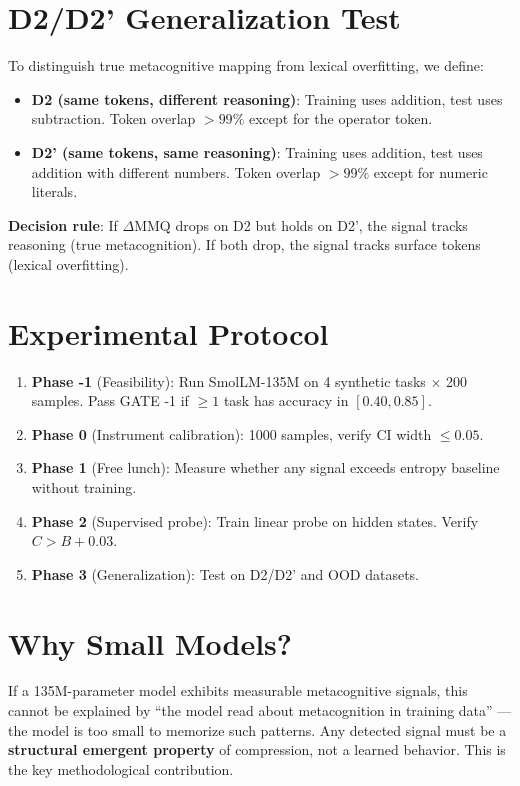 \documentclass{article}
\begin{document}
\section{D2/D2' Generalization Test}

To distinguish true metacognitive mapping from lexical overfitting, we define:

\begin{itemize}
\item \textbf{D2 (same tokens, different reasoning)}: Training uses addition, test uses subtraction. Token overlap $>99\%$ except for the operator token.
\item \textbf{D2' (same tokens, same reasoning)}: Training uses addition, test uses addition with different numbers. Token overlap $>99\%$ except for numeric literals.
\end{itemize}

\textbf{Decision rule}: If $\Delta\text{MMQ}$ drops on D2 but holds on D2', the signal tracks reasoning (true metacognition). If both drop, the signal tracks surface tokens (lexical overfitting).

\section{Experimental Protocol}

\begin{enumerate}
\item \textbf{Phase -1} (Feasibility): Run SmolLM-135M on 4 synthetic tasks $\times$ 200 samples. Pass GATE -1 if $\geq 1$ task has accuracy in $[0.40, 0.85]$.
\item \textbf{Phase 0} (Instrument calibration): 1000 samples, verify CI width $\leq 0.05$.
\item \textbf{Phase 1} (Free lunch): Measure whether any signal exceeds entropy baseline without training.
\item \textbf{Phase 2} (Supervised probe): Train linear probe on hidden states. Verify $C > B + 0.03$.
\item \textbf{Phase 3} (Generalization): Test on D2/D2' and OOD datasets.
\end{enumerate}

\section{Why Small Models?}

If a 135M-parameter model exhibits measurable metacognitive signals, this cannot be explained by ``the model read about metacognition in training data'' --- the model is too small to memorize such patterns. Any detected signal must be a \textbf{structural emergent property} of compression, not a learned behavior. This is the key methodological contribution.
\end{document}
